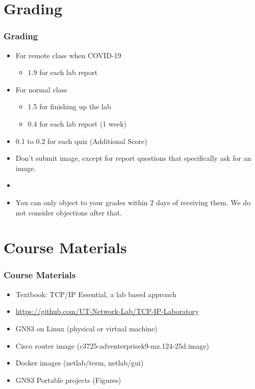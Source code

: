 \documentclass[15pt]{beamer}
\begin{document}
\section{Grading}
\begin{frame}
    \frametitle{Grading}

    \begin{itemize}
        \item For remote class when COVID-19
        \begin{itemize}
            \item {\color{red} 1.9} for each lab report
        \end{itemize}
        \item For normal class
        \begin{itemize}
            \item {\color{red} 1.5} for finishing up the lab
            \item {\color{red} 0.4} for each lab report (1 week)
        \end{itemize}
        \item {\color{red} 0.1} to {\color{red} 0.2} for each quiz (Additional Score)
        \item Don’t submit image, except for report questions that specifically ask for an image.
        \item 
        \item You can only object to your grades within {\color{red} 2 days} of receiving them. We do not consider objections after that. 
        
    \end{itemize}

\end{frame}

\section{Course Materials}
\begin{frame}
    \frametitle{Course Materials}

    \begin{itemize}
        \item Textbook: TCP/IP Essential, a lab based approach
        \item \url{https://github.com/UT-Network-Lab/TCP-IP-Laboratory}
        \item GNS3 on Linux (physical or virtual machine)
        \item Cisco router image (c3725-adventerprisek9-mz.124-25d.image)
        \item Docker images (netlab/term, netlab/gui)
        \item GNS3 Portable projects (Figures)
    \end{itemize}

\end{frame}
\end{document}
